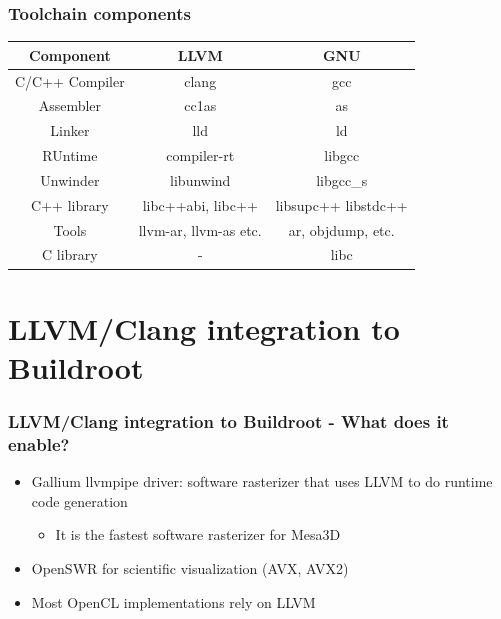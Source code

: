 \documentclass{beamer}
\begin{document}
\begin{frame}
\frametitle{Toolchain components}
\centering
  \begin{tabular}{c|c|c}
  \textbf{Component} & \textbf{LLVM} & \textbf{GNU} \\
  \hline
  C/C++ Compiler & clang & gcc \\
  Assembler & cc1as & as \\
  Linker & lld & ld \\
  RUntime & compiler-rt & libgcc \\
  Unwinder & libunwind & libgcc\_s \\
  C++ library & libc++abi, libc++ & libsupc++ libstdc++ \\
  Tools & llvm-ar, llvm-as etc. & ar, objdump, etc. \\
  C library & - & libc \\
  \end{tabular}
\end{frame}

\section{LLVM/Clang integration to Buildroot}

\begin{frame}
\frametitle{LLVM/Clang integration to Buildroot - What does it enable?}
\begin{itemize}
  \item Gallium llvmpipe driver: software rasterizer that uses LLVM to do runtime code generation
  \begin{itemize}
    \item It is the fastest software rasterizer for Mesa3D
  \end{itemize}
  \item OpenSWR for scientific visualization (AVX, AVX2)
  \item Most OpenCL implementations rely on LLVM
\end{itemize}
\end{frame}
\end{document}

